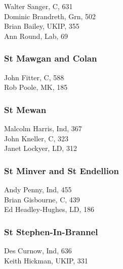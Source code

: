 \documentclass[a4paper,openany,10pt]{book}
\begin{document}


Walter Sanger, C, 631\\
Dominic Brandreth, Grn, 502\\
Brian Bailey, UKIP, 355\\
Ann Round, Lab, 69\\


\subsubsection*{St Mawgan and Colan}



John Fitter, C, 588\\
Rob Poole, MK, 185\\


\subsubsection*{St Mewan}



Malcolm Harris, Ind, 367\\
John Kneller, C, 323\\
Janet Lockyer, LD, 312\\


\subsubsection*{St Minver and St Endellion}



Andy Penny, Ind, 455\\
Brian Gisbourne, C, 439\\
Ed Headley-Hughes, LD, 186\\


\subsubsection*{St Stephen-In-Brannel}



Des Curnow, Ind, 636\\
Keith Hickman, UKIP, 331\\
\end{document}
